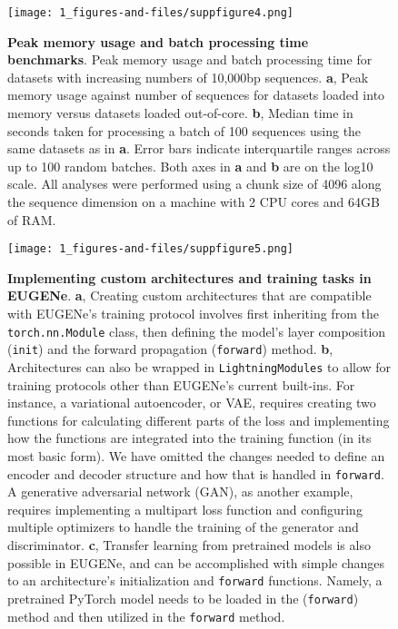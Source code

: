 \begin{figure}[p]
    \centering
    \texttt{[image: 1\_figures-and-files/suppfigure4.png]}
    \caption[Memory and batch time benchmarks]{\textbf{Peak memory usage and batch processing time benchmarks}. Peak memory usage and batch processing time for datasets with increasing numbers of 10,000bp sequences. \textbf{a}, Peak memory usage against number of sequences for datasets loaded into memory versus datasets loaded out-of-core. \textbf{b}, Median time in seconds taken for processing a batch of 100 sequences using the same datasets as in \textbf{a}. Error bars indicate interquartile ranges across up to 100 random batches. Both axes in \textbf{a} and \textbf{b} are on the log10 scale. All analyses were performed using a chunk size of 4096 along the sequence dimension on a machine with 2 CPU cores and 64GB of RAM.}
    \label{fig:1 supplementary_4}
\end{figure}

\begin{figure}[p]
    \centering
    \texttt{[image: 1\_figures-and-files/suppfigure5.png]}
    \caption[Custom model development in EUGENe]{\textbf{Implementing custom architectures and training tasks in EUGENe}. \textbf{a}, Creating custom architectures that are compatible with EUGENe’s training protocol involves first inheriting from the \texttt{torch.nn.Module} class, then defining the model’s layer composition (\texttt{init}) and the forward propagation (\texttt{forward}) method. \textbf{b}, Architectures can also be wrapped in \texttt{LightningModules} to allow for training protocols other than EUGENe’s current built-ins. For instance, a variational autoencoder, or VAE, requires creating two functions for calculating different parts of the loss and implementing how the functions are integrated into the training function (in its most basic form). We have omitted the changes needed to define an encoder and decoder structure and how that is handled in \texttt{forward}. A generative adversarial network (GAN), as another example, requires implementing a multipart loss function and configuring multiple optimizers to handle the training of the generator and discriminator. \textbf{c}, Transfer learning from pretrained models is also possible in EUGENe, and can be accomplished with simple changes to an architecture’s initialization and \texttt{forward} functions. Namely, a pretrained PyTorch model needs to be loaded in the (\texttt{forward}) method and then utilized in the \texttt{forward} method.}
    \label{fig:1 supplementary_5}
\end{figure}
